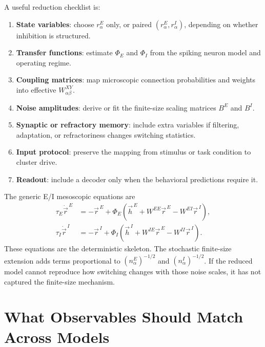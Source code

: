 A useful reduction checklist is:
%
\begin{enumerate}[leftmargin=*]
  \item \textbf{State variables}: choose $r_{\alpha}^{E}$ only, or paired $(r_{\alpha}^{E},r_{\alpha}^{I})$, depending on whether inhibition is structured.
  \item \textbf{Transfer functions}: estimate $\Phi_E$ and $\Phi_I$ from the spiking neuron model and operating regime.
  \item \textbf{Coupling matrices}: map microscopic connection probabilities and weights into effective $W^{XY}_{\alpha\beta}$.
  \item \textbf{Noise amplitudes}: derive or fit the finite-size scaling matrices $B^E$ and $B^I$.
  \item \textbf{Synaptic or refractory memory}: include extra variables if filtering, adaptation, or refractoriness changes switching statistics.
  \item \textbf{Input protocol}: preserve the mapping from stimulus or task condition to cluster drive.
  \item \textbf{Readout}: include a decoder only when the behavioral predictions require it.
\end{enumerate}

The generic E/I mesoscopic equations are
%
\begin{align}
  \tau_E\dot{\vec r}^{\,E}
  &=
  -\vec r^{\,E}
  +
  \Phi_E(\vec h^{\,E}+W^{EE}\vec r^{\,E}-W^{EI}\vec r^{\,I}),
  \label{eq:ch14-ei-meso-e}\\
  \tau_I\dot{\vec r}^{\,I}
  &=
  -\vec r^{\,I}
  +
  \Phi_I(\vec h^{\,I}+W^{IE}\vec r^{\,E}-W^{II}\vec r^{\,I}).
  \label{eq:ch14-ei-meso-i}
\end{align}
%
These equations are the deterministic skeleton. The stochastic finite-size extension adds terms proportional to ${(n_{\alpha}^{E})}^{-1/2}$ and ${(n_{\alpha}^{I})}^{-1/2}$. If the reduced model cannot reproduce how switching changes with those noise scales, it has not captured the finite-size mechanism.

\section{What Observables Should Match Across Models}
\label{sec:what-observables-should-match-across-models}

